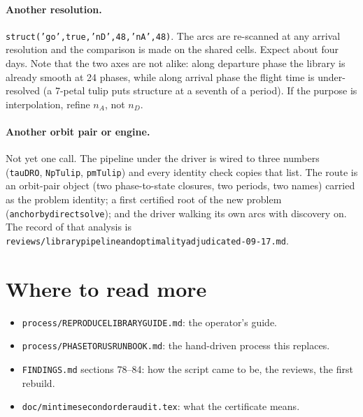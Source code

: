 \documentclass[11pt]{article}
\renewcommand{\_}{\textunderscore\allowbreak}
\newcommand{\code}[1]{\texttt{#1}}
\newcommand{\file}[1]{\texttt{\small #1}}
\begin{document}
\paragraph{Another resolution.} \code{struct('go',true,'nD',48,'nA',48)}.
The arcs are re-scanned at any arrival resolution and the comparison is made
on the shared cells. Expect about four days. Note that the two axes are not
alike: along departure phase the library is already smooth at 24 phases,
while along arrival phase the flight time is under-resolved (a 7-petal tulip
puts structure at a seventh of a period). If the purpose is interpolation,
refine $n_A$, not $n_D$.

\paragraph{Another orbit pair or engine.} Not yet one call. The pipeline
under the driver is wired to three numbers (\code{tauDRO}, \code{NpTulip},
\code{pmTulip}) and every identity check copies that list. The route is an
orbit-pair object (two phase-to-state closures, two periods, two names)
carried as the problem identity; a first certified root of the new problem
(\code{anchor\_by\_direct\_solve}); and the driver walking its own arcs with
discovery on. The record of that analysis is
\file{reviews/library\_pipeline\_and\_optimality\_adjudicated\_2026-09-17.md}.

\section*{Where to read more}
\begin{itemize}[itemsep=1pt]
\item \file{process/REPRODUCE\_LIBRARY\_GUIDE.md}: the operator's guide.
\item \file{process/PHASE\_TORUS\_RUNBOOK.md}: the hand-driven process this replaces.
\item \file{FINDINGS.md} sections 78--84: how the script came to be, the reviews, the first rebuild.
\item \file{doc/mintime\_second\_order\_audit.tex}: what the certificate means.
\end{itemize}
\end{document}

